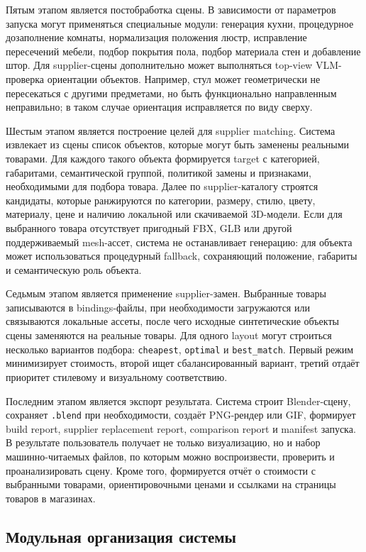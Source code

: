 \documentclass[times]{itmo-student-thesis}
\begin{document}
Пятым этапом является постобработка сцены. В зависимости от параметров запуска могут применяться специальные модули: генерация кухни, процедурное дозаполнение комнаты, нормализация положения люстр, исправление пересечений мебели, подбор покрытия пола, подбор материала стен и добавление штор. Для supplier-сцены дополнительно может выполняться top-view VLM-проверка ориентации объектов. Например, стул может геометрически не пересекаться с другими предметами, но быть функционально направленным неправильно; в таком случае ориентация исправляется по виду сверху.

Шестым этапом является построение целей для supplier matching. Система извлекает из сцены список объектов, которые могут быть заменены реальными товарами. Для каждого такого объекта формируется target с категорией, габаритами, семантической группой, политикой замены и признаками, необходимыми для подбора товара. Далее по supplier-каталогу строятся кандидаты, которые ранжируются по категории, размеру, стилю, цвету, материалу, цене и наличию локальной или скачиваемой 3D-модели. Если для выбранного товара отсутствует пригодный FBX, GLB или другой поддерживаемый mesh-ассет, система не останавливает генерацию: для объекта может использоваться процедурный fallback, сохраняющий положение, габариты и семантическую роль объекта.

Седьмым этапом является применение supplier-замен. Выбранные товары записываются в bindings-файлы, при необходимости загружаются или связываются локальные ассеты, после чего исходные синтетические объекты сцены заменяются на реальные товары. Для одного layout могут строиться несколько вариантов подбора: \texttt{cheapest}, \texttt{optimal} и \texttt{best\_match}. Первый режим минимизирует стоимость, второй ищет сбалансированный вариант, третий отдаёт приоритет стилевому и визуальному соответствию.

Последним этапом является экспорт результата. Система строит Blender-сцену, сохраняет \texttt{.blend} при необходимости, создаёт PNG-рендер или GIF, формирует build report, supplier replacement report, comparison report и manifest запуска. В результате пользователь получает не только визуализацию, но и набор машинно-читаемых файлов, по которым можно воспроизвести, проверить и проанализировать сцену. Кроме того, формируется отчёт о стоимости с выбранными товарами, ориентировочными ценами и ссылками на страницы товаров в магазинах.

\subsection{Модульная организация системы}
\end{document}
